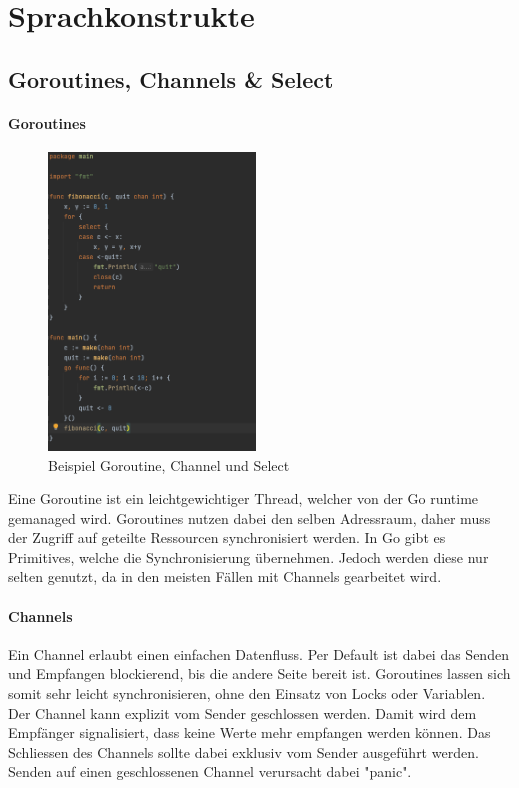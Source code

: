 \documentclass[12pt,titlepage]{article}
\begin{document}
\section{Sprachkonstrukte}
\subsection{Goroutines, Channels \& Select}
\paragraph{Goroutines}
\begin{figure}
	\includegraphics[width=5.5cm]{fibGoroutine}
	\caption{Beispiel Goroutine, Channel und Select}\label{img: fibGoroutine}
\end{figure}
Eine Goroutine ist ein leichtgewichtiger Thread, welcher von der Go runtime gemanaged wird.
Goroutines nutzen dabei den selben Adressraum, daher muss der Zugriff auf geteilte Ressourcen synchronisiert werden.
In Go gibt es Primitives, welche die Synchronisierung übernehmen. Jedoch werden diese nur selten genutzt, da in den meisten Fällen mit Channels gearbeitet wird.
\paragraph{Channels}
Ein Channel erlaubt einen einfachen Datenfluss. Per Default ist dabei das Senden und Empfangen blockierend, bis die andere Seite bereit ist. Goroutines lassen sich somit sehr leicht synchronisieren, ohne den Einsatz von Locks oder Variablen. Der Channel kann explizit vom Sender geschlossen werden. Damit wird dem Empfänger signalisiert, dass keine Werte mehr empfangen werden können. Das Schliessen des Channels sollte dabei exklusiv vom Sender ausgeführt werden. Senden auf einen geschlossenen Channel verursacht dabei "panic".
\end{document}
